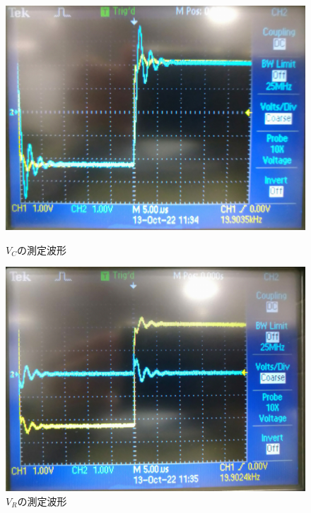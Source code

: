\begin{figure}[H]
    \begin{minipage}[b]{0.5\linewidth}
      \centering
      \includegraphics[keepaspectratio, scale=0.3]{DSC_0238.pdf}
      \caption{$V_C$の測定波形}
    \end{minipage}
    \begin{minipage}[b]{0.5\linewidth}
      \centering
      \includegraphics[keepaspectratio, scale=0.3]{DSC_0239.pdf}
      \caption{$V_R$の測定波形}
    \end{minipage}
  \end{figure}

